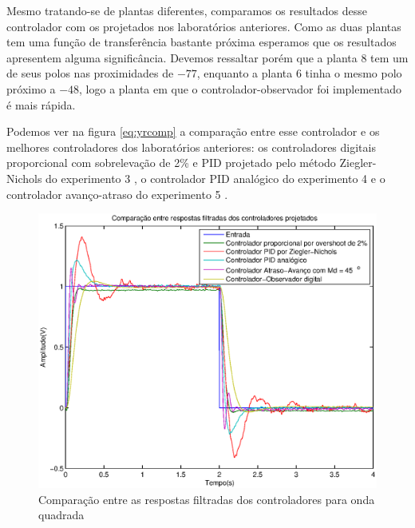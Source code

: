 \documentclass{article}
\begin{document}
Mesmo tratando-se de plantas diferentes, comparamos os resultados desse controlador com os projetados nos laboratórios anteriores. Como as duas plantas tem uma função de transferência bastante próxima esperamos que os resultados apresentem alguma significância. Devemos ressaltar porém que a planta $8$ tem um de seus polos nas proximidades de $-77$, enquanto a planta $6$ tinha o mesmo polo próximo a $-48$, logo a planta em que o controlador-observador foi implementado é mais rápida.

Podemos ver na figura \ref{eq:yrcomp} a comparação entre esse controlador e os melhores controladores dos laboratórios anteriores: os controladores digitais proporcional com sobrelevação de 2\% e PID projetado pelo método Ziegler-Nichols do experimento 3 \cite{bb:lab3}, o controlador PID analógico do experimento 4 \cite{bb:lab4} e o controlador avanço-atraso do experimento 5 \cite{bb:lab5}.
\begin{figure}[H]
	\centering
	\includegraphics[width=0.8\linewidth]{../yfrcomp}
	\caption{Comparação entre as respostas filtradas dos controladores para onda quadrada}
	\label{fig:yrcomp}
\end{figure}



\begin{thebibliography}{widestlabel}
\end{thebibliography}
\end{document}

